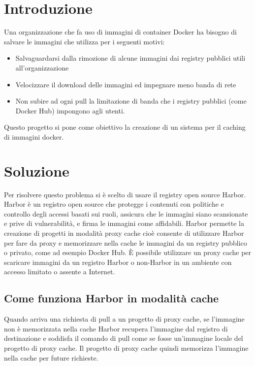 \documentclass[12pt]{report}
\begin{document}
\title{}
\date{}



\maketitle
\tableofcontents

\chapter{Introduzione}
Una organizzazione che fa uso di immagini di container Docker ha bisogno di salvare le immagini che utilizza per i seguenti motivi\cite{ICP}:
\begin{itemize}
    \item Salvaguardarsi dalla rimozione di alcune immagini dai registry pubblici utili all'organizzazione
    \item Velocizzare il download delle immagini ed impegnare meno banda di rete
    \item Non subire ad ogni pull la limitazione di banda che i registry pubblici (come Docker Hub) impongono agli utenti.
\end{itemize}
Questo progetto si pone come obiettivo la creazione di un sistema per il caching di immagini docker.

\chapter{Soluzione}
Per risolvere questo problema si è scelto di usare il registry open source Harbor. Harbor è un registro open source che protegge i contenuti con politiche e controllo degli accessi basati sui ruoli, assicura che le immagini siano scansionate e prive di vulnerabilità, e firma le immagini come affidabili. Harbor permette la creazione di progetti in modalità proxy cache cioè consente di utilizzare Harbor per fare da proxy e memorizzare nella cache le immagini da un registry pubblico o privato, come ad esempio Docker Hub. È possibile utilizzare un proxy cache per scaricare immagini da un registro Harbor o non-Harbor in un ambiente con accesso limitato o assente a Internet.
\section{Come funziona Harbor in modalità cache}
Quando arriva una richiesta di pull a un progetto di proxy cache, se l'immagine non è memorizzata nella cache Harbor recupera l'immagine dal registro di destinazione e soddisfa il comando di pull come se fosse un'immagine locale del progetto di proxy cache. Il progetto di proxy cache quindi memorizza l'immagine nella cache per future richieste.
\end{document}
